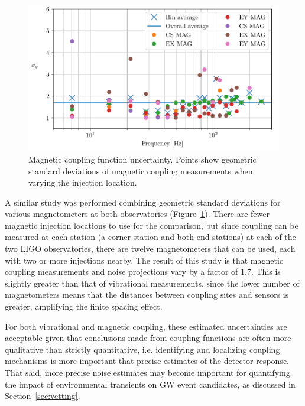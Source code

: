 \begin{figure}[h!]
	\centering
	\includegraphics{figures/noise-methods/cf-locations-mag.pdf}
	\caption[Magnetic coupling function uncertainty.]{
		Magnetic coupling function uncertainty.
		Points show geometric standard deviations of magnetic coupling measurements when varying the injection location.}
	\label{fig:cf-locations-mag}
\end{figure}

A similar study was performed combining geometric standard deviations for various magnetometers at both observatories (Figure~\ref{fig:cf-locations-mag}).
There are fewer magnetic injection locations to use for the comparison, but since coupling can be measured at each station (a corner station and both end stations) at each of the two LIGO observatories, there are twelve magnetometers that can be used, each with two or more injections nearby.
The result of this study is that magnetic coupling measurements and noise projections vary by a factor of 1.7.
This is slightly greater than that of vibrational measurements, since the lower number of magnetometers means that the distances between coupling sites and sensors is greater, amplifying the finite spacing effect.

For both vibrational and magnetic coupling, these estimated uncertainties are acceptable given that conclusions made from coupling functions are often more qualitative than strictly quantitative, i.e. identifying and localizing coupling mechanisms is more important that precise estimates of the detector response.
That said, more precise noise estimates may become important for quantifying the impact of environmental transients on \ac{GW} event candidates, as discussed in Section~\ref{sec:vetting}.


